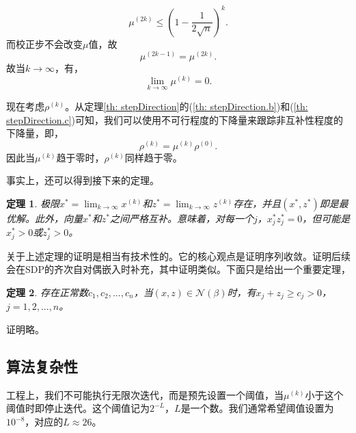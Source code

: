 \documentclass{ctexart}
\numberwithin{equation}{section} %
\newtheorem{theorem}{定理}[section]
\begin{document}
\begin{equation}
	\label{Eq: mu2k}
	\mu^{(2k)} \leq \left(1 - \frac{1}{2\sqrt{n}}\right)^k.
\end{equation}
而校正步不会改变$ \mu $值，故
\begin{equation}
	\mu^{(2k - 1)} = \mu^{(2k)}. \nonumber
\end{equation}
故当$ k \to \infty $，有，
\begin{equation}
	\lim_{k \to \infty} \mu^{(k)} = 0. \nonumber
\end{equation}

现在考虑$ \rho^{(k)} $。从定理\ref{th: stepDirection}的(\ref{th: stepDirection.b})和(\ref{th: stepDirection.c})可知，我们可以使用不可行程度的下降量来跟踪非互补性程度的下降量，即，
\begin{equation}
	\rho^{(k)} = \mu^{(k)}\rho^{(0)}. \nonumber
\end{equation}
因此当$ \mu^{(k)} $趋于零时，$ \rho^{(k)} $同样趋于零。

事实上，还可以得到接下来的定理。
\begin{theorem}
	极限$ x^* = \lim_{k \to \infty}x^{(k)} $和$ z^* = \lim_{k \to \infty}z^{(k)} $存在，并且$ \left(x^*, z^*\right) $即是最优解。此外，向量$ x^* $和$ z^* $之间严格互补。意味着，对每一个$ j $，$ x_j^*z_j^* = 0 $，但可能是$ x_j^* > 0 $或$ z_j^* > 0 $。
\end{theorem}

关于上述定理的证明是相当有技术性的。它的核心观点是证明序列收敛。证明后续会在SDP的齐次自对偶嵌入时补充，其中证明类似。下面只是给出一个重要定理，
\begin{theorem}
	存在正常数$ c_1, c_2, ..., c_n $，当$ \left(x, z\right) \in \mathcal{N}\left(\beta\right) $时，有$ x_j + z_j \geq c_j > 0 $，$ j = 1, 2, ..., n $。
\end{theorem}

证明略。

\subsection{算法复杂性}

工程上，我们不可能执行无限次迭代，而是预先设置一个阈值，当$ \mu^{(k)} $小于这个阈值时即停止迭代。这个阈值记为$ 2^{-L} $，$ L $是一个数。我们通常希望阈值设置为$ 10^{-8} $，对应的$ L\approx 26 $。
\end{document}
